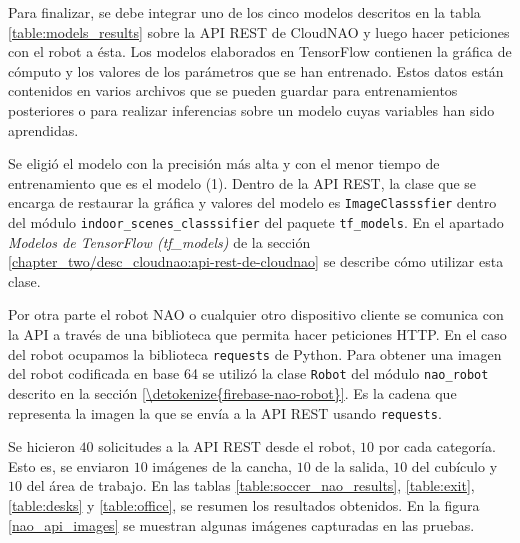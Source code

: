 Para finalizar,
se debe integrar uno de los cinco modelos descritos en la tabla \ref{table:models_results} sobre la API REST de CloudNAO y luego hacer peticiones con el robot a ésta.
Los modelos elaborados en TensorFlow contienen la gráfica de cómputo
y los valores de los parámetros que se han entrenado. Estos datos
están contenidos en varios archivos que se pueden guardar para
entrenamientos posteriores o para realizar inferencias sobre 
un modelo cuyas variables han sido aprendidas.

Se eligió el modelo con la precisión más alta y con el menor
tiempo de entrenamiento que es el modelo (1). 
Dentro de la API REST, la clase que se encarga de restaurar la gráfica y valores del modelo
es \texttt{ImageClasssfier} dentro del módulo \texttt{indoor\_scenes\_classsifier} del paquete \texttt{tf\_models}.
En el apartado \textit{Modelos de TensorFlow (tf\_models)}
de la sección \ref{chapter_two/desc_cloudnao:api-rest-de-cloudnao}
se describe cómo utilizar esta clase.

Por otra parte el robot NAO o cualquier otro
dispositivo cliente se comunica con la API a través
de una biblioteca que permita hacer peticiones 
HTTP. En el caso del robot ocupamos la biblioteca
\texttt{requests} de Python. Para obtener una imagen 
del robot codificada en base 64 se utilizó la clase \texttt{Robot}
del módulo \texttt{nao\_robot} descrito en la sección
\ref{\detokenize{firebase-nao-robot}}. Es la cadena
que representa la imagen la que se envía a la API REST usando
\texttt{requests}.

Se hicieron $40$ solicitudes a la API REST desde el robot,
$10$ por cada categoría. Esto es, se enviaron
$10$ imágenes de la cancha, $10$ de la salida,
$10$ del cubículo y $10$ del área de trabajo.
En las tablas \ref{table:soccer_nao_results},
\ref{table:exit}, \ref{table:desks} y
\ref{table:office}, se resumen los resultados obtenidos.
En la figura \ref{nao_api_images} se muestran algunas imágenes capturadas en las pruebas.




